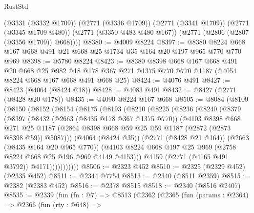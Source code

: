 \begin{lexlean}{RustStd}
\begin{coremodule}
        (@3331 (@3332 @1709))
        (@2771 (@3336 @1709))
        (@2771 (@3341 @1709))
        (@2771 (@3345 @1709 @480))
        (@2771 (@3350 @483 @480 @167))
        (@2771 (@2806 (@2807 (@3356 @1709)) @668))))
@8380 := @4009 @8224
@8397 := @8380 @8224 @668 @167 @668 @491 @21 @668 @25 @1734 @35 @164 @20 @197 @965 @770 @770 @969
@8398 := @5780 @8224
@8423 := @8380
    @8398
    @668
    @167
    @668
    @491
    @20
    @668
    @25
    @982
    @18
    @178
    @367
    @271
    @1375
    @770
    @770
    @1187
    (@4054 @8224 @668 @167 @668 @491 @668 @25)
@8424 := @4076 @491
@8427 := @8423 (@4064 (@8424 @18))
@8428 := @4083 @491
@8432 := @8427 (@2771 (@8428 @20 @178))
@8435 := @4090 @8224 @167 @668
@8505 := @8084
    (@8109
      (@8150
        (@8152
          (@8154
            (@8175
              (@8193
                (@8210
                  (@8225
                    (@8236
                      (@8240
                        (@8379
                          (@8397
                            (@8432
                              (@2663 (@8435 @178 @367 @1375 @770))
                              (@4103
                                @8398
                                @668
                                @271
                                @25
                                @1187
                                (@2864
                                  @8398
                                  @668
                                  @59
                                  @25
                                  @59
                                  @1187
                                  (@2872 (@2873 @8398 @59))
                                  @5087)))
                            (@4064 (@8424 @35))
                            (@2771 (@8428 @21 @164))
                            (@2663 (@8435 @164 @20 @965 @770))
                            (@4103
                              @8224
                              @668
                              @197
                              @25
                              @969
                              (@2758 @8224 @668 @25 @196 @969 @4149 @4153)))
                          @4159
                          (@2771 (@4165 @491 @3792))
                          @4171)))))))))))
@8506 := @2323 @452
@8510 := @2325 (@2329 @452) (@2335 @452)
@8511 := @2344 @7754
@8513 := @2340 (@8511 @2359)
@8515 := @2382 (@2383 @452)
@8516 := @2378 @8515
@8518 := @2340 (@8516 @2407)
@8535 := @2339
    (fun (fn : @7) =>
    @8513
      (@2362
        (@2365
          (fun (params : @2364) =>
          @2366
            (fun (rty : @648) =>

\end{coremodule}
\end{lexlean}
